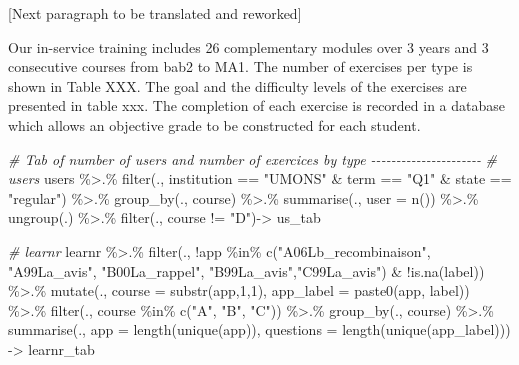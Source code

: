 \documentclass[
]{article}
\newenvironment{Shaded}{\begin{snugshade}}{\end{snugshade}}
\newcommand{\AttributeTok}[1]{\textcolor[rgb]{0.77,0.63,0.00}{#1}}
\newcommand{\CommentTok}[1]{\textcolor[rgb]{0.56,0.35,0.01}{\textit{#1}}}
\newcommand{\DecValTok}[1]{\textcolor[rgb]{0.00,0.00,0.81}{#1}}
\newcommand{\FunctionTok}[1]{\textcolor[rgb]{0.00,0.00,0.00}{#1}}
\newcommand{\NormalTok}[1]{#1}
\newcommand{\OtherTok}[1]{\textcolor[rgb]{0.56,0.35,0.01}{#1}}
\newcommand{\SpecialCharTok}[1]{\textcolor[rgb]{0.00,0.00,0.00}{#1}}
\newcommand{\StringTok}[1]{\textcolor[rgb]{0.31,0.60,0.02}{#1}}
\begin{document}
{[}Next paragraph to be translated and reworked{]}

Our in-service training includes 26 complementary modules over 3 years
and 3 consecutive courses from bab2 to MA1. The number of exercises per
type is shown in Table XXX. The goal and the difficulty levels of the
exercises are presented in table xxx. The completion of each exercise is
recorded in a database which allows an objective grade to be constructed
for each student.

\begin{Shaded}
\begin{Highlighting}[]
\CommentTok{\# Tab of number of users and number of exercices by type {-}{-}{-}{-}{-}{-}{-}{-}{-}{-}{-}{-}{-}{-}{-}{-}{-}{-}{-}{-}{-}{-}}
\CommentTok{\# users}
\NormalTok{users }\SpecialCharTok{\%\textgreater{}.\%}
  \FunctionTok{filter}\NormalTok{(., institution }\SpecialCharTok{==} \StringTok{"UMONS"} \SpecialCharTok{\&}\NormalTok{ term }\SpecialCharTok{==} \StringTok{"Q1"} \SpecialCharTok{\&}\NormalTok{ state }\SpecialCharTok{==} \StringTok{"regular"}\NormalTok{) }\SpecialCharTok{\%\textgreater{}.\%}
  \FunctionTok{group\_by}\NormalTok{(., course) }\SpecialCharTok{\%\textgreater{}.\%}
  \FunctionTok{summarise}\NormalTok{(., }\AttributeTok{user =} \FunctionTok{n}\NormalTok{()) }\SpecialCharTok{\%\textgreater{}.\%}
  \FunctionTok{ungroup}\NormalTok{(.) }\SpecialCharTok{\%\textgreater{}.\%}
  \FunctionTok{filter}\NormalTok{(., course }\SpecialCharTok{!=} \StringTok{"D"}\NormalTok{)}\OtherTok{{-}\textgreater{}}\NormalTok{ us\_tab}

\CommentTok{\# learnr}
\NormalTok{learnr }\SpecialCharTok{\%\textgreater{}.\%} 
  \FunctionTok{filter}\NormalTok{(., }\SpecialCharTok{!}\NormalTok{app }\SpecialCharTok{\%in\%} \FunctionTok{c}\NormalTok{(}\StringTok{"A06Lb\_recombinaison"}\NormalTok{, }\StringTok{"A99La\_avis"}\NormalTok{, }\StringTok{"B00La\_rappel"}\NormalTok{, }\StringTok{"B99La\_avis"}\NormalTok{,}\StringTok{"C99La\_avis"}\NormalTok{) }\SpecialCharTok{\&} \SpecialCharTok{!}\FunctionTok{is.na}\NormalTok{(label)) }\SpecialCharTok{\%\textgreater{}.\%}
  \FunctionTok{mutate}\NormalTok{(., }\AttributeTok{course =} \FunctionTok{substr}\NormalTok{(app,}\DecValTok{1}\NormalTok{,}\DecValTok{1}\NormalTok{),}
    \AttributeTok{app\_label =} \FunctionTok{paste0}\NormalTok{(app, label)) }\SpecialCharTok{\%\textgreater{}.\%}
  \FunctionTok{filter}\NormalTok{(., course }\SpecialCharTok{\%in\%} \FunctionTok{c}\NormalTok{(}\StringTok{"A"}\NormalTok{, }\StringTok{"B"}\NormalTok{, }\StringTok{"C"}\NormalTok{)) }\SpecialCharTok{\%\textgreater{}.\%}
  \FunctionTok{group\_by}\NormalTok{(., course) }\SpecialCharTok{\%\textgreater{}.\%}
  \FunctionTok{summarise}\NormalTok{(., }\AttributeTok{app =} \FunctionTok{length}\NormalTok{(}\FunctionTok{unique}\NormalTok{(app)), }\AttributeTok{questions =} \FunctionTok{length}\NormalTok{(}\FunctionTok{unique}\NormalTok{(app\_label))) }\OtherTok{{-}\textgreater{}}\NormalTok{ learnr\_tab }


\end{Highlighting}
\end{Shaded}
\end{document}
